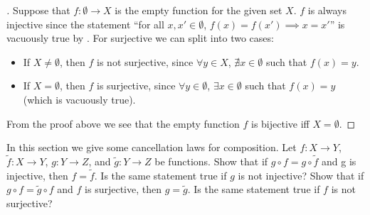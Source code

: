 \begin{proof}[]
  Suppose that \(f : \emptyset \to X\) is the empty function for the given set \(X\).
  \(f\) is always injective since the statement ``for all \(x, x' \in \emptyset\), \(f(x) = f(x') \implies x = x'\)'' is vacuously true by .
  For surjective we can split into two cases:
  \begin{itemize}
    \item If \(X \neq \emptyset\), then \(f\) is not surjective, since \(\forall y \in X\), \(\nexists x \in \emptyset\) such that \(f(x) = y\).
    \item If \(X = \emptyset\), then \(f\) is surjective, since \(\forall y \in \emptyset\), \(\exists x \in \emptyset\) such that \(f(x) = y\) (which is vacuously true).
  \end{itemize}
  From the proof above we see that the empty function \(f\) is bijective iff \(X = \emptyset\).
\end{proof}

\begin{ex}\label{i:ex:3.3.4}
  In this section we give some cancellation laws for composition.
  Let \(f : X \to Y\), \(\tilde{f} : X \to Y\), \(g : Y \to Z\), and \(\tilde{g} : Y \to Z\) be functions.
  Show that if \(g \circ f = g \circ \tilde{f}\) and g is injective, then \(f = \tilde{f}\).
  Is the same statement true if \(g\) is not injective?
  Show that if \(g \circ f = \tilde{g} \circ f\) and \(f\) is surjective, then \(g = \tilde{g}\).
  Is the same statement true if \(f\) is not surjective?
\end{ex}


